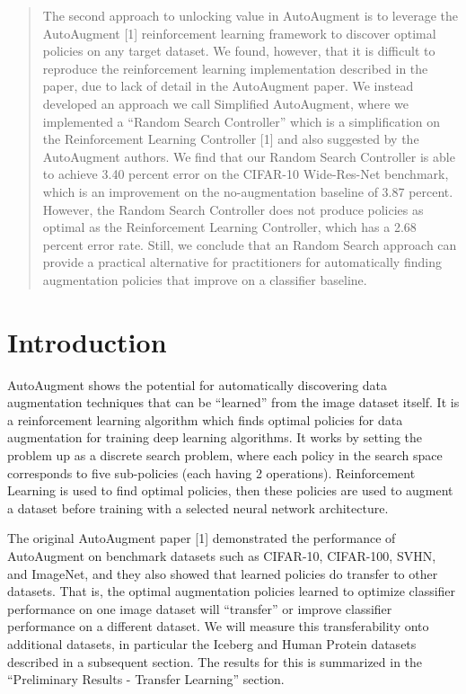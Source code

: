 \documentclass[10pt,twocolumn,letterpaper]{article}
\begin{document}
\begin{abstract}
The second approach to unlocking value in AutoAugment is to leverage the AutoAugment [1] reinforcement learning framework to discover optimal policies on any target dataset.  We found, however, that it is difficult to reproduce the reinforcement learning implementation described in the paper, due to lack of detail in the AutoAugment paper.  We instead developed an approach we call Simplified AutoAugment, where we implemented a “Random Search Controller” which is a simplification on the Reinforcement Learning Controller [1] and also suggested by the AutoAugment authors.  We find that our Random Search Controller is able to achieve 3.40 percent error on the CIFAR-10 Wide-Res-Net benchmark, which is an improvement on the no-augmentation baseline of 3.87 percent.  However, the Random Search Controller does not produce policies as optimal as the Reinforcement Learning Controller, which has a 2.68 percent error rate.  Still, we conclude that an Random Search approach can provide a practical alternative for practitioners for automatically finding augmentation policies that improve on a classifier baseline.

\end{abstract}

\section{Introduction}

AutoAugment shows the potential for automatically discovering data augmentation techniques that can be “learned” from the image dataset itself. It is a reinforcement learning algorithm which finds optimal policies for data augmentation for training deep learning algorithms. It works by setting the problem up as a discrete search problem, where each policy in the search space corresponds to five sub-policies (each having 2 operations). Reinforcement Learning is used to find optimal policies, then these policies are used to augment a dataset before training with a selected neural network architecture.

The original AutoAugment paper [1] demonstrated the performance of AutoAugment on benchmark datasets such as CIFAR-10, CIFAR-100, SVHN, and ImageNet, and they also showed that learned policies do transfer to other datasets.   That is, the optimal augmentation policies learned to optimize classifier performance on one image dataset will “transfer” or improve classifier performance on a different dataset.   We will measure this transferability onto additional datasets, in particular the Iceberg and Human Protein datasets described in a subsequent section.  The results for this is summarized in the “Preliminary Results - Transfer Learning” section.
\end{document}
